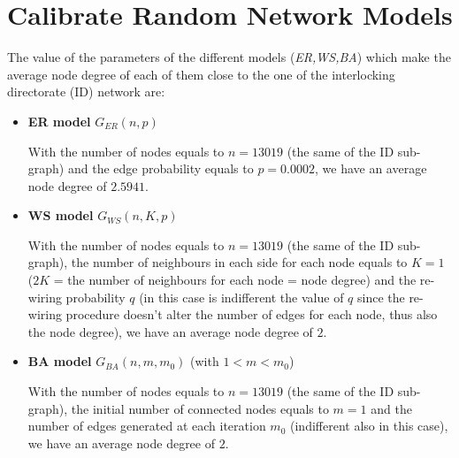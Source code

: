 \documentclass{article}
\begin{document}
\section{Calibrate Random Network Models}
The value of the parameters of the different models (\textit{ER,WS,BA}) which make the average node degree of each of them close to the one of the interlocking directorate (ID) network are:

\begin{itemize}
    \item \textbf{ER model}  \(G_{ER}(n,p)\) \newline
    
    \par\noindent With the number of nodes equals to \(n = 13019\) (the same of the ID sub-graph) and the edge probability equals to \(p=0.0002\), we have an average node degree of \(2.5941\).
    
    \item \textbf{WS model}  \(G_{WS}(n,K,p)\) \newline
    
    \par\noindent With the number of nodes equals to \(n = 13019\) (the same of the ID sub-graph), the number of neighbours in each side for each node equals to \(K=1\) (\(2K\) = the number of neighbours for each node = node degree) and the re-wiring probability \(q\) (in this case is indifferent the value of \(q\) since the  re-wiring procedure doesn't alter the number of edges for each node, thus also the node degree), we have an average node degree of \(2\).
    
    \item \textbf{BA model}  \(G_{BA}(n,m,m_{0})\) (with \(1 < m < m_{0}\)) \newline
    
    \par\noindent With the number of nodes equals to \(n = 13019\) (the same of the ID sub-graph), the initial number of connected nodes equals to \(m = 1\) and the number of edges generated at each iteration \(m_{0}\) (indifferent also in this case), we have an average node degree of \(2\).
\end{itemize}
\end{document}
